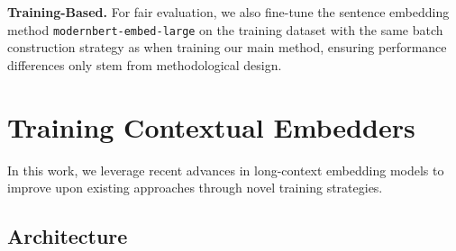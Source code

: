 \noindent\textbf{Training-Based.} For fair evaluation, we also fine-tune the sentence embedding method \texttt{modernbert-embed-large} on the training dataset with the same batch construction strategy as when training our main method, ensuring performance differences only stem from methodological design.








\section{Training Contextual Embedders}

In this work, we leverage recent advances in long-context embedding models  to improve upon existing approaches through novel training strategies.

\subsection{Architecture}
\label{subsection:conteb:architecture}

